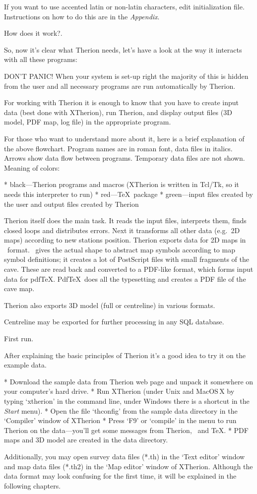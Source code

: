 If you want to use accented latin or non-latin characters, edit initialization 
file. Instructions on how to do this are in the {\it Appendix}.


\subchapter How does it work?.

So, now it's clear what Therion needs, let's have a look at the way 
it interacts with all these programs:


DON'T PANIC! When your system is set-up right the majority of this is hidden from 
the user and all necessary programs are run automatically by Therion. 

For working with Therion it is enough to know that you have to create input data 
(best done with XTherion), run Therion, and display output files 
(3D model, PDF map, log file) in the appropriate program. 

For those who want to understand more about it, here is a brief explanation of 
the above flowchart. Program names are in roman font, data files in italics. 
Arrows show data flow between programs. Temporary data files are not shown. 
Meaning of colors:

\list
* black---Therion programs and macros (XTherion is written in Tcl/Tk,
  so it needs this interpreter to run)
* red---\TeX\ package
* green---input files created by the user and output files created by Therion
\endlist

Therion itself does the main task. It reads the input files, interprets them, 
finds closed loops and distributes errors. Next it transforms all other data 
(e.g.~2D maps) according to new stations position.
Therion exports data for 2D maps in \MP\ format. \MP\ gives 
the actual shape to abstract map symbols according to map symbol definitions; it
creates a lot of PostScript files with small fragments of the cave. These are 
read back and converted to a PDF-like format, which forms input data 
for pdf\TeX. Pdf\TeX\ does all the typesetting and creates a PDF file of the cave 
map. 

Therion also exports 3D model (full or centreline) in various formats.

Centreline may be exported for further processing in any SQL database.


\subchapter First run.

After explaining the basic principles of Therion it's a good idea to try it
on the example data.

\list
* Download the sample data from Therion web page and unpack it somewhere on
  your computer's hard drive.
* Run XTherion (under Unix and MacOS\,X by typing `xtherion' in the command 
  line, under Windows there is a shortcut in the {\it Start} menu).
* Open the file `thconfig' from the sample data directory in the `Compiler'
  window of XTherion
* Press `F9' or `compile' in the menu to run Therion on the data---you'll get
  some messages from Therion, \MP\ and \TeX.  
* PDF maps and 3D model are created in the data directory.  
\endlist

Additionally, you may open survey data files (*.th) in the `Text editor' window 
and map data files (*.th2) in the `Map editor' window of XTherion. Although the 
data format may look confusing for the first time, it will be explained in the 
following chapters.

\endinput
